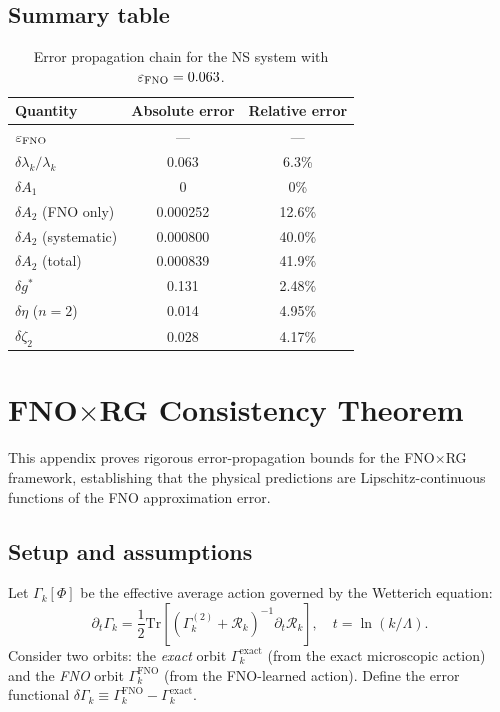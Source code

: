 \subsection{Summary table}

\begin{table}[ht]
\centering \small
\caption{Error propagation chain for the NS system with $\varepsilon_{\text{FNO}} = 0.063$.}
\begin{ruledtabular}
\begin{tabular}{lcc}
\hline\hline
Quantity & Absolute error & Relative error \\
\hline
$\varepsilon_{\text{FNO}}$ & --- & --- \\
$\delta\lambda_k/\lambda_k$ & 0.063 & 6.3\% \\
$\delta A_1$ & 0 & 0\% \\
$\delta A_2$ (FNO only) & 0.000252 & 12.6\% \\
$\delta A_2$ (systematic) & 0.000800 & 40.0\% \\
$\delta A_2$ (total) & 0.000839 & 41.9\% \\
$\delta g^*$ & 0.131 & 2.48\% \\
$\delta\eta$ ($n{=}2$) & 0.014 & 4.95\% \\
$\delta\zeta_2$ & 0.028 & 4.17\% \\
\hline\hline
\end{tabular}
\end{ruledtabular}
\end{table}

\section{FNO$\times$RG Consistency Theorem\label{app:consistency}}

This appendix proves rigorous error-propagation bounds for the FNO$\times$RG framework, establishing that the physical predictions are Lipschitz-continuous functions of the FNO approximation error.

\subsection{Setup and assumptions}

Let $\Gamma_k[\Phi]$ be the effective average action governed by the Wetterich equation:
\begin{equation}\label{eq:wetterich_app}
\partial_t\Gamma_k = \frac{1}{2}\mathrm{Tr}\left[(\Gamma_k^{(2)} + \mathcal{R}_k)^{-1}\partial_t\mathcal{R}_k\right], \quad t = \ln(k/\Lambda).
\end{equation}
Consider two orbits: the \emph{exact} orbit $\Gamma_k^{\mathrm{exact}}$ (from the exact microscopic action) and the \emph{FNO} orbit $\Gamma_k^{\mathrm{FNO}}$ (from the FNO-learned action). Define the error functional $\delta\Gamma_k \equiv \Gamma_k^{\mathrm{FNO}} - \Gamma_k^{\mathrm{exact}}$.

